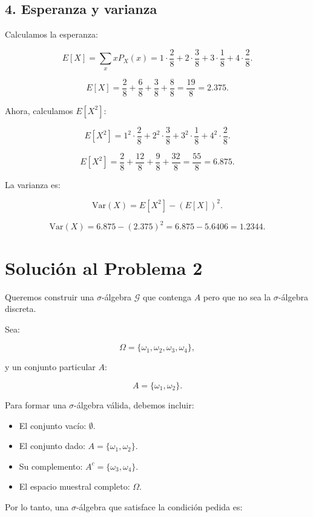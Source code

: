 \documentclass[a4paper,12pt]{article}
\begin{document}
\subsection*{4. Esperanza y varianza}

Calculamos la esperanza:

\[
E[X] = \sum_{x} x P_X(x) = 1 \cdot \frac{2}{8} + 2 \cdot \frac{3}{8} + 3 \cdot \frac{1}{8} + 4 \cdot \frac{2}{8}.
\]

\[
E[X] = \frac{2}{8} + \frac{6}{8} + \frac{3}{8} + \frac{8}{8} = \frac{19}{8} = 2.375.
\]

Ahora, calculamos \(E[X^2]\):

\[
E[X^2] = 1^2 \cdot \frac{2}{8} + 2^2 \cdot \frac{3}{8} + 3^2 \cdot \frac{1}{8} + 4^2 \cdot \frac{2}{8}.
\]

\[
E[X^2] = \frac{2}{8} + \frac{12}{8} + \frac{9}{8} + \frac{32}{8} = \frac{55}{8} = 6.875.
\]

La varianza es:

\[
\text{Var}(X) = E[X^2] - (E[X])^2.
\]

\[
\text{Var}(X) = 6.875 - (2.375)^2 = 6.875 - 5.6406 = 1.2344.
\]

\section*{Solución al Problema 2}

Queremos construir una \(\sigma\)-álgebra \(\mathcal{G}\) que contenga \(A\) pero que no sea la \(\sigma\)-álgebra discreta.

Sea:

\[
\Omega = \{ \omega_1, \omega_2, \omega_3, \omega_4 \},
\]

y un conjunto particular \(A\):

\[
A = \{ \omega_1, \omega_2 \}.
\]

Para formar una \(\sigma\)-álgebra válida, debemos incluir:
\begin{itemize}
    \item El conjunto vacío: \(\emptyset\).
    \item El conjunto dado: \(A = \{ \omega_1, \omega_2 \}\).
    \item Su complemento: \(A^c = \{ \omega_3, \omega_4 \}\).
    \item El espacio muestral completo: \(\Omega\).
\end{itemize}

Por lo tanto, una \(\sigma\)-álgebra que satisface la condición pedida es:
\end{document}
